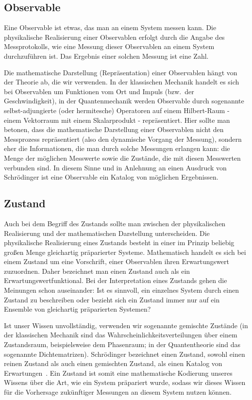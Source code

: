\subsection{Observable}

Eine Observable ist etwas, das man an einem System messen kann. 
Die physikalische Realisierung einer Observablen erfolgt durch die Angabe des Messprotokolls, wie
eine Messung dieser Observablen an einem System durchzuf\"uhren ist. Das Ergebnis einer solchen
Messung ist eine Zahl.

Die mathematische Darstellung (Repr\"asentation) einer Observablen h\"angt von der Theorie
ab, die wir verwenden. In der klassischen Mechanik handelt es sich bei Observablen um 
Funktionen vom Ort und Impuls (bzw.\ der Geschwindigkeit), in der Quantenmechanik
werden Observable durch sogenannte selbst-adjungierte (oder hermitesche) Operatoren auf einem
Hilbert-Raum - einem Vektorraum mit einem Skalarprodukt - repr\"asentiert. Hier sollte man betonen,
dass die mathematische Darstellung einer Observablen nicht den Messprozess repr\"asentiert (also
den dynamische Vorgang der Messung), sondern eher die Informationen, die man durch solche
Messungen erlangen kann: die Menge der m\"oglichen Messwerte sowie die Zust\"ande, die mit
diesen Messwerten verbunden sind. In diesem Sinne und in Anlehnung an einen Ausdruck von
Schr\"odinger \cite{Schroedinger} ist eine Observable ein \glqq Katalog von
m\"oglichen Ergebnissen\grqq. 

\subsection{Zustand}

Auch bei dem Begriff des Zustands sollte man zwischen der physikalischen Realisierung und der
mathematischen Darstellung unterscheiden. Die physikalische Realisierung eines Zustands
besteht in einer im Prinzip beliebig gro\ss en Menge gleichartig pr\"aparierter Systeme.
Mathematisch handelt es sich bei einem Zustand um eine Vorschrift, einer Observablen
ihren Erwartungswert zuzuordnen. Daher bezeichnet man einen Zustand auch als ein
Erwartungswertfunktional. Bei der Interpretation eines Zustands gehen die Meinungen schon
auseinander: Ist es sinnvoll, ein einzelnes System durch einen Zustand zu beschreiben
oder bezieht sich ein Zustand immer nur auf ein Ensemble von 
gleichartig pr\"aparierten Systemen? 

Ist unser Wissen unvollst\"andig, verwenden
wir sogenannte gemischte Zust\"ande (in der klassischen Mechanik sind das Wahrscheinlichkeitsverteilungen
\"uber einem Zustandsraum, beispielsweise dem Phasenraum; in der Quantentheorie sind das
sogenannte Dichtematrizen). 
Schr\"odinger bezeichnet einen Zustand, sowohl einen reinen Zustand als auch einen gemischten Zustand, 
als einen \glqq Katalog von Erwartungen\grqq\ \cite{Schroedinger}. 
Ein Zustand ist somit eine mathematische Kodierung unseres Wissens \"uber die Art, wie ein
System pr\"apariert wurde, sodass wir dieses Wissen f\"ur die Vorhersage zuk\"unftiger
Messungen an diesem System nutzen k\"onnen. 

